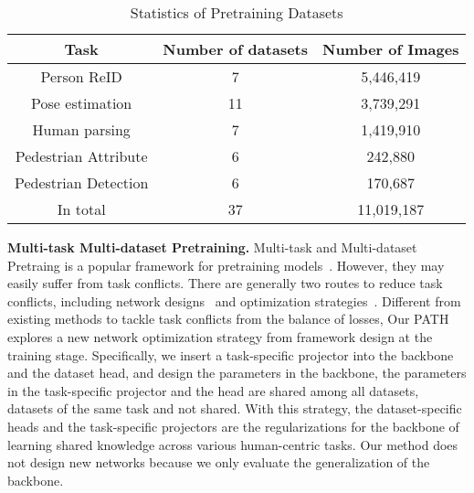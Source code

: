 \documentclass[10pt,twocolumn,letterpaper]{article}
\begin{document}
\begin{table}[t]
  \centering
  \footnotesize
  \caption{Statistics of Pretraining Datasets}
    \begin{tabular}{ccc}
    \toprule
    Task  & Number of datasets & Number of Images \\
    \midrule
    Person ReID  & 7     & 5,446,419 \\
    Pose estimation  & 11    & 3,739,291 \\
    Human parsing & 7     & 1,419,910 \\
    Pedestrian Attribute & 6     & 242,880 \\
    Pedestrian Detection & 6     & 170,687 \\
    \midrule
    In total & 37    & 11,019,187 \\
    \bottomrule
    \end{tabular}\label{tab:pretraining}\vspace{-1em}
\end{table}


\noindent \textbf{Multi-task  Multi-dataset  Pretraining.}
Multi-task and Multi-dataset Pretraing is a popular framework for pretraining models~\cite{zhu2022uni,wang2022ofa,he2022x}. However, they may easily suffer from task conflicts. There are generally two routes to reduce task conflicts, including network designs~\cite{he2017mask, liu2019end, misra2016cross, teichmann2018multinet, kokkinos2017ubernet, lu2017fully} and optimization strategies~\cite{kendall2018multi, chen2018gradnorm, liu2019end, guo2018dynamic, sener2018multi}. Different from existing methods to tackle task conflicts from the balance of losses, Our PATH explores a new network optimization strategy from framework design at the training stage. Specifically, we insert a task-specific projector into the backbone and the dataset head, and design the parameters in the backbone, the parameters in the task-specific projector and the head are shared among all datasets, datasets of the same task and not shared. With this strategy, the dataset-specific heads and the task-specific projectors are the regularizations for the backbone of learning shared knowledge across various human-centric tasks. Our method does not design new networks because we only evaluate the generalization of the backbone.
\end{document}
